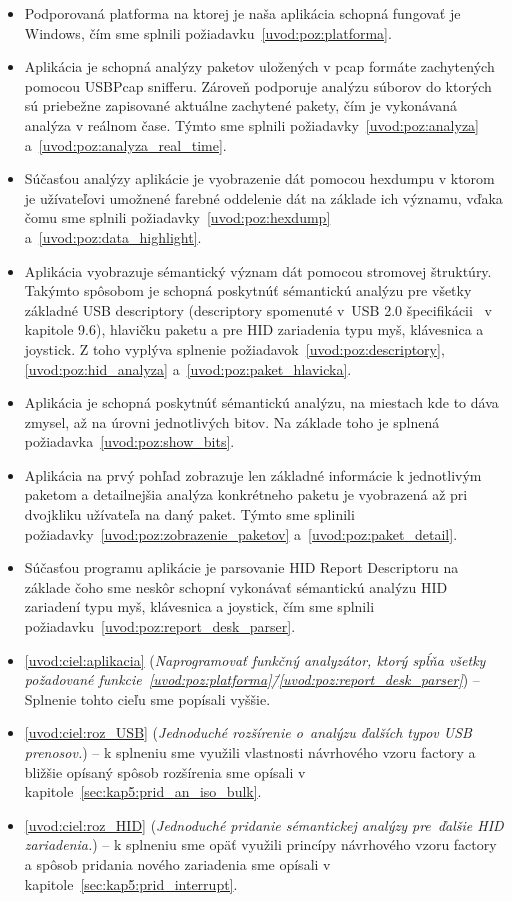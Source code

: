 \begin{itemize}
\item Podporovaná platforma na ktorej je naša aplikácia schopná fungovať je Windows, čím sme splnili požiadavku~\ref{uvod:poz:platforma}.
\item Aplikácia je schopná analýzy paketov uložených v pcap formáte zachytených pomocou USBPcap snifferu. Zároveň podporuje analýzu súborov do ktorých sú priebežne zapisované aktuálne zachytené pakety, čím je vykonávaná analýza v reálnom čase. Týmto sme splnili požiadavky~\ref{uvod:poz:analyza} a~\ref{uvod:poz:analyza_real_time}.
\item Súčasťou analýzy aplikácie je vyobrazenie dát pomocou hexdumpu v ktorom je užívateľovi umožnené farebné oddelenie dát na základe ich významu, vďaka čomu sme splnili požiadavky~\ref{uvod:poz:hexdump} a~\ref{uvod:poz:data_highlight}.
\item Aplikácia vyobrazuje sémantický význam dát pomocou stromovej štruktúry. Takýmto spôsobom je schopná poskytnúť sémantickú analýzu pre všetky základné USB descriptory (descriptory spomenuté v~USB 2.0 špecifikácii~\cite{usbdoc} v kapitole 9.6), hlavičku paketu a pre HID zariadenia typu myš, klávesnica a joystick. Z toho vyplýva splnenie požiadavok~\ref{uvod:poz:descriptory}, \ref{uvod:poz:hid_analyza} a~\ref{uvod:poz:paket_hlavicka}.
\item Aplikácia je schopná poskytnúť sémantickú analýzu, na miestach kde to dáva zmysel, až na úrovni jednotlivých bitov. Na základe toho je splnená požiadavka~\ref{uvod:poz:show_bits}.
\item Aplikácia na prvý pohľad zobrazuje len základné informácie k jednotlivým paketom a detailnejšia analýza konkrétneho paketu je vyobrazená až pri dvojkliku užívateľa na daný paket. Týmto sme splinili požiadavky~\ref{uvod:poz:zobrazenie_paketov} a~\ref{uvod:poz:paket_detail}.
\item Súčasťou programu aplikácie je parsovanie HID Report Descriptoru na základe čoho sme neskôr schopní vykonávať sémantickú analýzu HID zariadení typu myš, klávesnica a joystick, čím sme splnili požiadavku~\ref{uvod:poz:report_desk_parser}.
\item \ref{uvod:ciel:aplikacia} (\textit{Naprogramovať funkčný analyzátor, ktorý spĺňa všetky požadované funkcie~\ref{uvod:poz:platforma}\=/\ref{uvod:poz:report_desk_parser}}) -- Splnenie tohto cieľu sme popísali vyššie.
\item \ref{uvod:ciel:roz_USB} (\textit{Jednoduché rozšírenie o~analýzu ďalších typov USB prenosov.}) -- k splneniu sme využili vlastnosti návrhového vzoru factory a bližšie opísaný spôsob rozšírenia sme opísali v kapitole~\ref{sec:kap5:prid_an_iso_bulk}.
\item \ref{uvod:ciel:roz_HID} (\textit{Jednoduché pridanie sémantickej analýzy pre~ďalšie HID zariadenia.}) -- k splneniu sme opäť využili princípy návrhového vzoru factory a spôsob pridania nového zariadenia sme opísali v kapitole~\ref{sec:kap5:prid_interrupt}.
\end{itemize}




